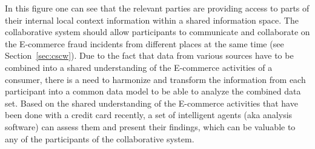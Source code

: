 In this figure one can see that the relevant parties are providing access to parts of their internal local context information within a shared information space. The collaborative system should allow participants to communicate and collaborate on the \gls{E-commerce} fraud incidents from different places at the same time (see Section~\ref{sec:cscw}). Due to the fact that data from various sources have to be combined into a shared understanding of the \gls{E-commerce} activities of a consumer, there is a need to harmonize and transform the information from each participant into a common data model to be able to analyze the combined data set. Based on the shared understanding of the \gls{E-commerce} activities that have been done with a credit card recently, a set of intelligent agents (aka analysis software) can assess them and present their findings, which can be valuable to any of the participants of the collaborative system.

